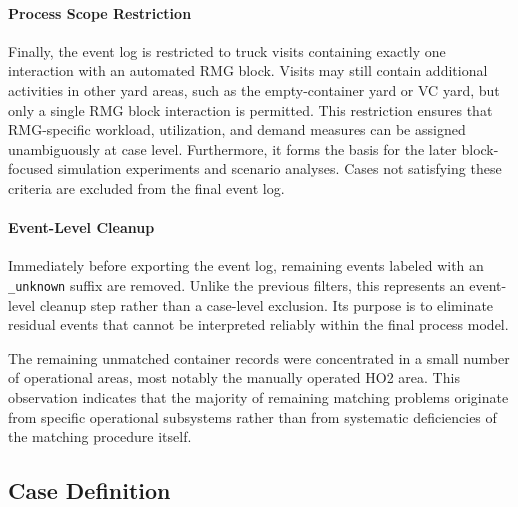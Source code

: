           \paragraph{Process Scope Restriction} 
          Finally, the event log is restricted to truck visits containing exactly one interaction with an automated RMG block. Visits may still contain additional activities in other yard areas, such as the empty-container yard or VC yard, but only a single RMG block interaction is permitted. This restriction ensures that RMG-specific workload, utilization, and demand measures can be assigned unambiguously at case level. Furthermore, it forms the basis for the later block-focused simulation experiments and scenario analyses. Cases not satisfying these criteria are excluded from the final event log. 
          \paragraph{Event-Level Cleanup} 
          Immediately before exporting the event log, remaining events labeled with an \texttt{\_unknown} suffix are removed. Unlike the previous filters, this represents an event-level cleanup step rather than a case-level exclusion. Its purpose is to eliminate residual events that cannot be interpreted reliably within the final process model.

        \begin{sloppypar}
        The remaining unmatched container records were concentrated in a small number of operational areas, most notably the manually operated HO2 area. This observation indicates that the majority of remaining matching problems originate from specific operational subsystems rather than from systematic deficiencies of the matching procedure itself.
        \end{sloppypar}
    
    \subsection{Case Definition} 
    
